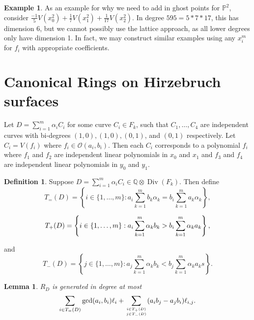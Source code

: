 \documentclass{amsart}
\theoremstyle{plain}
\newtheorem{lem}[thm]{Lemma}
\theoremstyle{definition}
\newtheorem{defn}[thm]{Definition}
\newtheorem{example}[thm]{Example}
\theoremstyle{remark}
\numberwithin{equation}{section}
\newcommand\bp{{\mathbb P}}
\DeclareMathOperator\di{Div}
\newcommand\bida{a}
\newcommand\bidb{b}
\begin{document}
\begin{example}
\label{eg:radical}
As an example for why we need to add in ghost points for $\bp^2$, consider $\frac{-1}{5}V(x_0^2) + \frac{1}{7}V(x_1^2) + \frac{1}{17}V(x_2^2)$. In degree $595 = 5* 7 * 17$, this has dimension $6$, but we cannot possibly use the lattice approach, as all lower degrees only have dimension 1. In fact, we may construct similar examples using any $x_i^m$ for $f_i$ with appropriate coefficients.
\end{example}

\section{Canonical Rings on Hirzebruch surfaces}
Let $D=\sum_{i=1}^m \alpha_i C_i$ for some curve $C_i\in F_k$, such
that $C_1, \ldots, C_4$ are independent curves with bi-degrees $(1,0)
, (1,0), (0,1)$, and $(0,1)$ respectively. Let $C_i = V(f_i)$ where
$f_i \in \mathscr{O}(\bida_i, \bidb_i)$. Then each $C_i$ corresponds to a
polynomial $f_i$ where $f_1$ and $f_2$ are independent linear
polynomials in $x_0$ and $x_1$ and $f_3$ and $f_4$ are independent
linear polynomials in $y_0$ and $y_1$.

\begin{defn}
Suppose $D = \sum_{i=1}^m \alpha_i C_i \in \mathbb{Q} \otimes \di(F_
k)$. Then define 
\begin{equation}\label{eqn:define-T=(D)}
	T_=(D) = \left\{i \in \{1, \ldots, m\}: \bida_i \sum_{k=1}^m \bidb_k 
\alpha_k = \bidb_i \sum_{k=1}^m \bida_k \alpha_k \right\},
\end{equation}

\begin{equation}\label{eqn:define-T+(D)}
	T_+(D) = \left\{ i \in \{1, \ldots, m\}:  \vphantom{\sum_{k=1}^m} 
\bida_i \sum_{k=1}^m \alpha_k \bidb_k > \bidb_i \sum_{k=1}^m \alpha_k \bida_k 
\right\},
\end{equation}

\noindent
and
\begin{equation}\label{eqn:define-T-(D)}
	T_-(D) = \left\{ j \in \{1, \ldots, m\}: \bida_j \sum_{k=1}^m \alpha_
k \bidb_k < \bidb_j \sum_{k=1}^m \alpha_k \bida_k s \right\}.
\end{equation}
\end{defn}

\begin{lem}
$R_D$ is generated in degree at most
\[
	\sum_{i\in T_=(D)} \gcd(\bida_i, \bidb_i) \ell_i + \sum_{i\in T_+(D) \atop j\in T_-(D)} (\bida_i \bidb_j- \bida_j \bidb_i)\ell_{i,j}.
\]
\end{lem}
\end{document}
